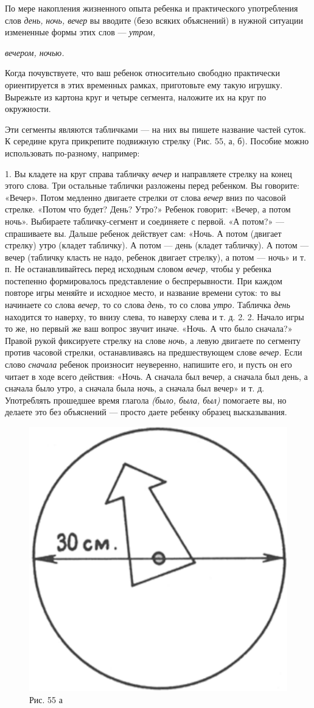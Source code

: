 \documentclass{book}
\renewcommand{\emph}[1]{\textit{#1}}
\begin{document}
По мере накопления жизненного опыта ребенка и практического употребления
слов \emph{день,} \emph{ночь, вечер} вы вводите (безо всяких объяснений)
в нужной ситуации измененные формы этих слов --- \emph{утром,}

\emph{вечером, ночью.}

Когда почувствуете, что ваш ребенок относительно свободно практически
ориентируется в этих временных рамках, приготовьте ему такую игрушку.
Вырежьте из картона круг и четыре сегмента, наложите их на круг по
окружности.

Эти сегменты являются табличками --- на них вы пишете название частей
суток. К середине круга прикрепите подвижную стрелку (Рис. 55, а, б).
Пособие можно использовать по-разному, например:

1. Вы кладете на круг справа табличку \emph{вечер} и направляете стрелку
на конец этого слова. Три остальные таблички разложены перед ребенком.
Вы говорите: «Вечер». Потом медленно двигаете стрелки от слова
\emph{вечер} вниз по часовой стрелке. «Потом что будет? День? Утро?»
Ребенок говорит: «Вечер, а потом ночь». Выбираете табличку-сегмент и
соединяете с первой. «А потом?» --- спрашиваете вы. Дальше ребенок
действует сам: «Ночь. А потом (двигает стрелку) утро (кладет табличку).
А потом --- день (кладет табличку). А потом --- вечер (табличку класть
не надо, ребенок двигает стрелку), а потом --- ночь» и т. п. Не
останавливайтесь перед исходным словом \emph{вечер,} чтобы у ребенка
постепенно формировалось представление о беспрерывности. При каждом
повторе игры меняйте и исходное место, и название времени суток: то вы
начинаете со слова \emph{вечер,} то со слова \emph{день,} то со слова
\emph{утро.} Табличка \emph{день} находится то наверху, то внизу слева,
то наверху слева и т. д. 2. 2. Начало игры то же, но первый же ваш
вопрос звучит иначе. «Ночь. А что было сначала?» Правой рукой фиксируете
стрелку на слове \emph{ночь,} а левую двигаете по сегменту против
часовой стрелки, останавливаясь на предшествующем слове \emph{вечер.}
Если слово \emph{сначала} ребенок произносит неуверенно, напишите его, и
пусть он его читает в ходе всего действия: «Ночь. А сначала был вечер, а
сначала был день, а сначала было утро, а сначала была ночь, а сначала
был вечер» и т. д. Употреблять прошедшее время глагола \emph{(было,
была, был)} помогаете вы, но делаете это без объяснений --- просто даете
ребенку образец высказывания.

\begin{figure}
\centering
\includegraphics[width=0.4\linewidth]{media/media/image51.png}
\caption*{Рис. 55 а}
\end{figure}
\end{document}
